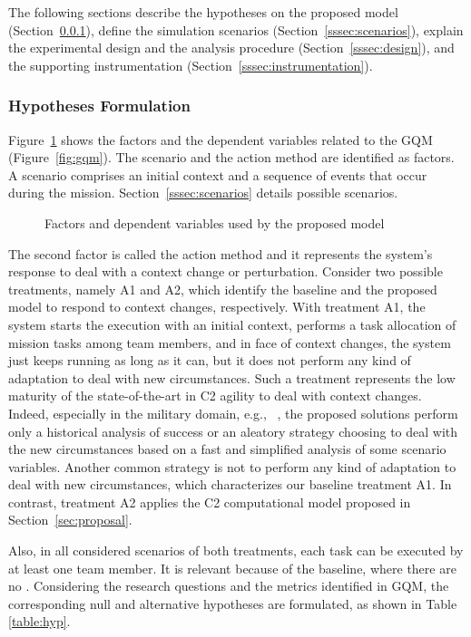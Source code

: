 The following sections describe the hypotheses on the proposed model (Section~\ref{sssec:hyp}), define the simulation scenarios  (Section~\ref{sssec:scenarios}), explain the experimental design and the analysis procedure (Section~\ref{sssec:design}), and the supporting instrumentation (Section~\ref{sssec:instrumentation}).


\subsubsection{Hypotheses Formulation}
\label{sssec:hyp}

Figure~\ref{fig:variables} shows the factors and the dependent variables related to the GQM (Figure~\ref{fig:gqm}). The scenario and the action method are identified as factors. A scenario comprises an initial context and a sequence of events that occur during the mission. Section~\ref{sssec:scenarios} details possible scenarios.

\begin{figure}[ht!]
    \centering
    \scalebox{.55}{}
    \caption{Factors and dependent variables used by the proposed model}
    \label{fig:variables}
\end{figure}

The second factor is called the action method and it represents the system's response to deal with a context change or perturbation. Consider two possible treatments, namely A1 and A2, which identify the baseline and the proposed model to respond to context changes, respectively. With treatment A1, the system starts the execution with an initial context, performs a task allocation of mission tasks among team members, and in face of context changes, the system just keeps running as long as it can, but it does not perform any kind of adaptation to deal with new circumstances. Such a treatment represents the low maturity of the state-of-the-art in C2 agility to deal with context changes. Indeed, especially in the military domain, e.g., ~\citet{CC03, FRANCE2014}, the proposed solutions perform only a historical analysis of success or an aleatory strategy choosing to deal with the new circumstances based on a fast and simplified analysis of some scenario variables. Another common strategy is 
not to perform any kind of adaptation to deal with new circumstances, which characterizes our baseline treatment A1. In contrast, treatment A2 applies the C2 computational model proposed in Section~\ref{sec:proposal}. 

Also, in all considered scenarios of both treatments, each task can be executed by at least one team member. It is relevant because of the baseline, where there are no .
Considering the research questions and the metrics identified in GQM, the corresponding null and alternative hypotheses are formulated, as shown in Table \ref{table:hyp}. 

